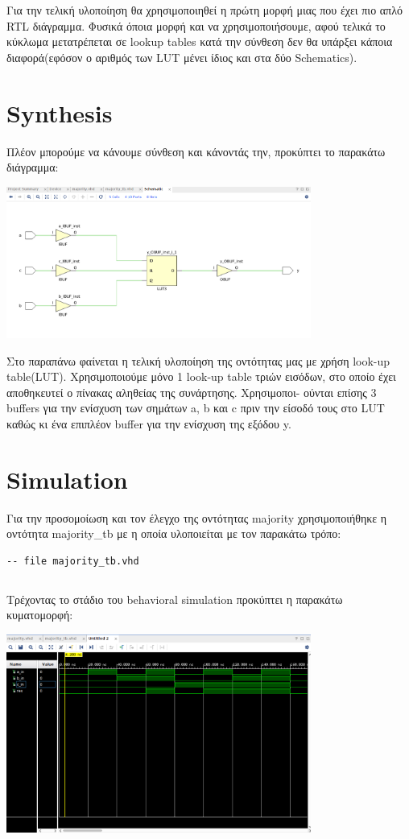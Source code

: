 \documentclass[]{article}
\begin{document}
Για την τελική υλοποίηση θα χρησιμοποιηθεί η πρώτη μορφή μιας που έχει πιο απλό RTL διάγραμμα.
Φυσικά όποια μορφή και να χρησιμοποιήσουμε, αφού τελικά το κύκλωμα μετατρέπεται σε lookup tables κατά την σύνθεση δεν θα υπάρξει κάποια διαφορά(εφόσον ο αριθμός των LUT μένει ίδιος και στα δύο Schematics).

\section{Synthesis}
Πλέον μπορούμε να κάνουμε σύνθεση και κάνοντάς την, προκύπτει το παρακάτω διάγραμμα:
\begin{center}
	\includegraphics[width=10cm]{synthesis_schem.png}
\end{center}

Στο παραπάνω φαίνεται η τελική υλοποίηση της οντότητας μας με χρήση look-up table(LUT). Χρησιμοποιούμε μόνο
1 look-up table τριών εισόδων, στο οποίο έχει αποθηκευτεί ο πίνακας αληθείας της συνάρτησης. Χρησιμοποι-
ούνται επίσης 3 buffers για την ενίσχυση των σημάτων a, b και c πριν την είσοδό τους στο LUT καθώς κι ένα επιπλέον buffer για την ενίσχυση της εξόδου y.

\section{Simulation}
Για την προσομοίωση και τον έλεγχο της οντότητας majority χρησιμοποιήθηκε η οντότητα majority\_tb με η οποία υλοποιείται με τον παρακάτω τρόπο:
\begin{verbatim}
-- file majority_tb.vhd
\end{verbatim}
\inputminted{vhdl}{./assign_1/majority_tb.vhdl}

Τρέχοντας το στάδιο του behavioral simulation προκύπτει η παρακάτω κυματομορφή:
\begin{center}
	\includegraphics[width=10cm]{behavioral.png}
\end{center}
\end{document}
